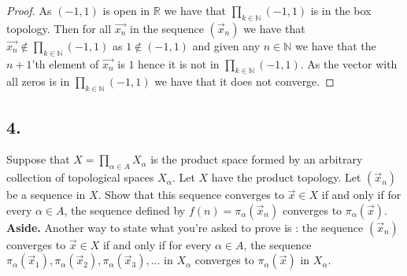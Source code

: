 \documentclass{amsart}
\theoremstyle{plain}
\theoremstyle{definition}
\theoremstyle{remark}
\begin{document}
\begin{proof}

    As $(-1,1)$ is open in $\mathbb{R}$ we have that $\prod_{k\in \mathbb{N}}(-1,1)$ is in the box topology. Then for all $\vec{x_n}$ in the sequence $(\vec x_n)$ we have that $\vec{x_n}\not \in \prod_{k\in \mathbb{N}}(-1,1)$ as $1\not \in (-1,1)$ and given any $n\in \mathbb{N}$ we have that the $n+1$'th element of $\vec{x_n}$ is $1$ hence it is not in $\prod_{k\in \mathbb{N}}(-1,1)$. As the vector with all zeros is in $\prod_{k\in \mathbb{N}}(-1,1)$ we have that it does not converge.

    
\end{proof}



\vspace{.15in}

\noindent
\subsection*{4.} Suppose that  $X = \prod _{\alpha \in A} X_{\alpha}$ is the product space formed by an arbitrary collection of topological spaces $X_{\alpha}$. Let $X$ have the product topology. Let $(\vec{x}_n)$ be a sequence in $X$. Show that this sequence converges to $\vec{x} \in X$ if and only if for every $\alpha \in A$, the sequence defined by $f(n) = \pi _{\alpha} (\vec{x}_n)$ converges to $ \pi _{\alpha} (\vec{x})$. {\bfseries Aside.} Another way to state what you're asked to prove is : the sequence $(\vec{x}_n)$ converges to $\vec{x} \in X$ if and only if for every $\alpha \in A$, the sequence $\pi _{\alpha} (\vec{x}_1) , \pi _{\alpha} (\vec{x}_2), \pi _{\alpha} (\vec{x}_3) , . . . $ in $X_{\alpha}$ converges to $ \pi _{\alpha} (\vec{x})$ in $X_{\alpha}$.
\end{document}
